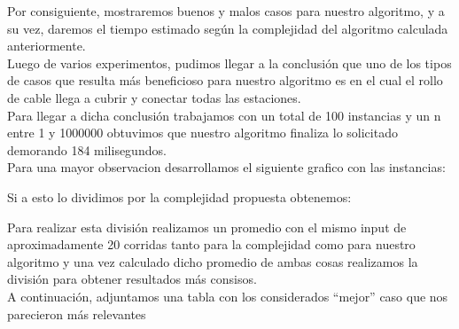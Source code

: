 \indent Por consiguiente, mostraremos buenos y malos casos para nuestro algoritmo, y a su vez, daremos el tiempo estimado 
seg\'un la complejidad del algoritmo calculada anteriormente.\\

Luego de varios experimentos, pudimos llegar a la conclusi\'on que uno de los tipos de casos que resulta m\'as beneficioso para nuestro algoritmo
es en el cual el rollo de cable llega a cubrir y conectar todas las estaciones.\\

Para llegar a dicha conclusi\'on trabajamos con un total de 100 instancias y un n entre 1 y 1000000 obtuvimos que nuestro
algoritmo finaliza lo solicitado demorando 184 milisegundos.\\

Para una mayor observacion desarrollamos el siguiente grafico con las instancias:\\

\vspace*{0.3cm} \vspace*{0.3cm}
  \begin{center}
  \end{center}
  \vspace*{0.3cm}


Si a esto lo dividimos por la complejidad propuesta obtenemos:\\

\vspace*{0.3cm} \vspace*{0.3cm}
  \begin{center}
  \end{center}
  \vspace*{0.3cm}

 Para realizar esta divisi\'on realizamos un promedio con el mismo input de aproximadamente 20 corridas
tanto para la complejidad como para nuestro algoritmo y una vez calculado dicho promedio de ambas cosas realizamos la divisi\'on para
obtener resultados m\'as consisos.\\ 

  
  
A continuaci\'on, adjuntamos una tabla con los considerados “mejor” caso que nos parecieron m\'as relevantes

